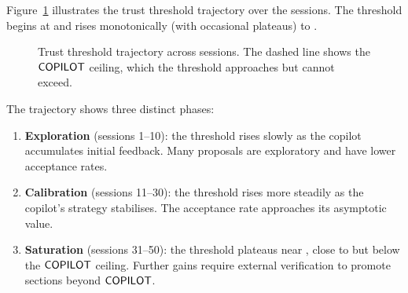 \documentclass[11pt]{article}
\newcommand{\trustval}{\tau_{\mathrm{val}}}
\begin{document}
Figure~\ref{fig:adaptation-trajectory} illustrates the trust
threshold trajectory over the \ppLXXXVInumSessions{} sessions.
The threshold begins at \ppLXXXVIinitTrust{} and rises
monotonically (with occasional plateaus) to \ppLXXXVIfinalTrust{}.

\begin{figure}[t]
\centering
{}
\caption{Trust threshold trajectory across sessions.  The dashed
         line shows the $\mathsf{COPILOT}$ ceiling, which the threshold
         approaches but cannot exceed.}\label{fig:adaptation-trajectory}
\end{figure}

The trajectory shows three distinct phases:
\begin{enumerate}
  \item \textbf{Exploration} (sessions 1--10): the threshold rises
        slowly as the copilot accumulates initial feedback.  Many
        proposals are exploratory and have lower acceptance rates.
  \item \textbf{Calibration} (sessions 11--30): the threshold rises
        more steadily as the copilot's strategy stabilises.  The
        acceptance rate approaches its asymptotic value.
  \item \textbf{Saturation} (sessions 31--50): the threshold
        plateaus near \ppLXXXVIfinalTrust{}, close to but below the
        $\mathsf{COPILOT}$ ceiling.  Further gains require external
        verification to promote sections beyond $\mathsf{COPILOT}$.
\end{enumerate}
\end{document}
